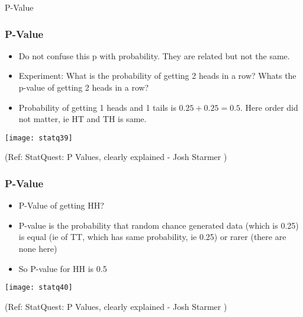 \begin{frame}
\begin{center}
{\Large P-Value}
\end{center}
\end{frame}



\begin{frame}[fragile]\frametitle{P-Value}


	\begin{itemize}

	\item Do not confuse this p with probability. They are related but not the same.
	\item Experiment: What is the probability of getting 2 heads in a row? Whats the p-value of getting 2 heads in a row?
	\item Probability of getting 1 heads and 1 tails is $0.25 + 0.25 = 0.5$. Here order did not matter, ie HT and TH is same.
	
	\end{itemize}


      \begin{center}
      \texttt{[image: statq39]}
	  	\end{center}

  
 
\tiny{(Ref: StatQuest: P Values, clearly explained - Josh Starmer )}
\end{frame}

\begin{frame}[fragile]\frametitle{P-Value}

\begin{itemize}

	\item P-Value of getting HH?
	\item P-value is the probability that random chance generated data (which is 0.25) is equal (ie of TT, which has same probability, ie 0.25) or rarer (there are none here)
	\item So P-value for HH is 0.5
	
	\end{itemize}

      \begin{center}
      \texttt{[image: statq40]}
	  	\end{center}

  
  
 
\tiny{(Ref: StatQuest: P Values, clearly explained - Josh Starmer )}
\end{frame}

